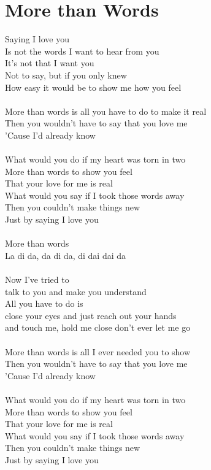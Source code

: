 \section{More than Words}
Saying I love you\\
Is not the words I want to hear from you\\
It's not that I want you\\
Not to say, but if you only knew\\
How easy it would be to show me how you feel \\
\\
More than words is all you have to do to make it real \\
Then you wouldn't have to say that you love me \\
'Cause I'd already know \\
\\
What would you do if my heart was torn in two \\
More than words to show you feel \\
That your love for me is real \\
What would you say if I took those words away \\
Then you couldn't make things new \\
Just by saying I love you\\
\\
More than words \\
La di da, da di da, di dai dai da\\
\\
Now I've tried to \\
talk to you and make you understand \\
All you have to do is\\
close your eyes and just reach out your hands\\
and touch me, hold me close don't ever let me go \\
\\
More than words is all I ever needed you to show \\
Then you wouldn't have to say that you love me \\
'Cause I'd already know\\
\\
What would you do if my heart was torn in two \\
More than words to show you feel \\
That your love for me is real \\
What would you say if I took those words away \\
Then you couldn't make things new \\
Just by saying I love you\\